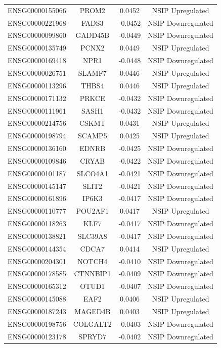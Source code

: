\documentclass[
]{article}
\begin{document}
\begin{singlespace}
\begin{longtable}[t]{lccc}
ENSG00000155066 & PROM2 & 0.0452 & NSIP Upregulated\\
\addlinespace
ENSG00000221968 & FADS3 & -0.0452 & NSIP Downregulated\\
ENSG00000099860 & GADD45B & -0.0449 & NSIP Downregulated\\
ENSG00000135749 & PCNX2 & 0.0449 & NSIP Upregulated\\
ENSG00000169418 & NPR1 & -0.0448 & NSIP Downregulated\\
ENSG00000026751 & SLAMF7 & 0.0446 & NSIP Upregulated\\
\addlinespace
ENSG00000113296 & THBS4 & 0.0446 & NSIP Upregulated\\
ENSG00000171132 & PRKCE & -0.0432 & NSIP Downregulated\\
ENSG00000111961 & SASH1 & -0.0432 & NSIP Downregulated\\
ENSG00000214756 & CSKMT & 0.0431 & NSIP Upregulated\\
ENSG00000198794 & SCAMP5 & 0.0425 & NSIP Upregulated\\
\addlinespace
ENSG00000136160 & EDNRB & -0.0425 & NSIP Downregulated\\
ENSG00000109846 & CRYAB & -0.0422 & NSIP Downregulated\\
ENSG00000101187 & SLCO4A1 & -0.0421 & NSIP Downregulated\\
ENSG00000145147 & SLIT2 & -0.0421 & NSIP Downregulated\\
ENSG00000161896 & IP6K3 & -0.0417 & NSIP Downregulated\\
\addlinespace
ENSG00000110777 & POU2AF1 & 0.0417 & NSIP Upregulated\\
ENSG00000118263 & KLF7 & -0.0417 & NSIP Downregulated\\
ENSG00000138821 & SLC39A8 & -0.0417 & NSIP Downregulated\\
ENSG00000144354 & CDCA7 & 0.0414 & NSIP Upregulated\\
ENSG00000204301 & NOTCH4 & -0.0410 & NSIP Downregulated\\
\addlinespace
ENSG00000178585 & CTNNBIP1 & -0.0409 & NSIP Downregulated\\
ENSG00000165312 & OTUD1 & -0.0407 & NSIP Downregulated\\
ENSG00000145088 & EAF2 & 0.0406 & NSIP Upregulated\\
ENSG00000187243 & MAGED4B & 0.0403 & NSIP Upregulated\\
ENSG00000198756 & COLGALT2 & -0.0403 & NSIP Downregulated\\
\addlinespace
ENSG00000123178 & SPRYD7 & -0.0402 & NSIP Downregulated\\

\end{longtable}
\end{singlespace}
\end{document}
